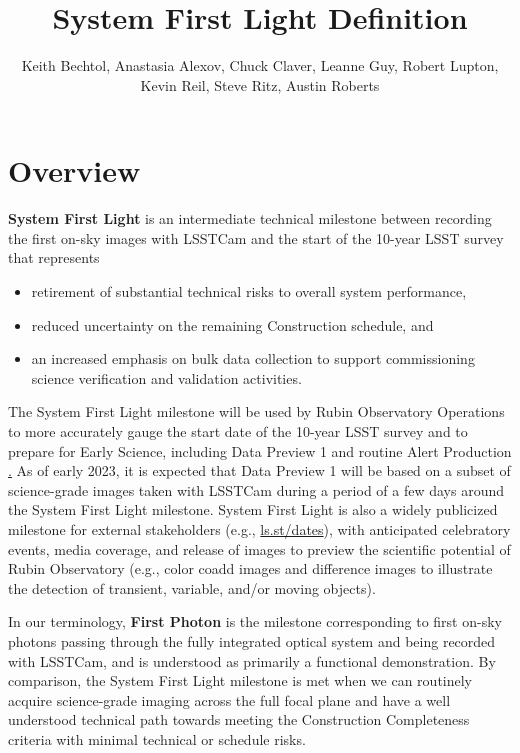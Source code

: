 \documentclass[SE,authoryear,toc,lsstdraft]{lsstdoc}
\title{System First Light Definition}
\author{%
Keith Bechtol, Anastasia Alexov, Chuck Claver, Leanne Guy, Robert Lupton, Kevin Reil, Steve Ritz, Austin Roberts
}
\date{\vcsDate}
\begin{document}
\maketitle


\section{Overview}

\textbf{System First Light} is an intermediate technical milestone between recording the first on-sky images with LSSTCam and the start of the 10-year LSST survey that represents
\begin{itemize}
  \item retirement of substantial technical risks to overall system performance,
  \item reduced uncertainty on the remaining Construction schedule, and
  \item an increased emphasis on bulk data collection to support commissioning science verification and validation activities.
\end{itemize}

The System First Light milestone will be used by Rubin Observatory Operations to more accurately gauge the start date of the 10-year LSST survey and to prepare for Early Science, including Data Preview 1 and routine Alert Production  \href{https://rtn-011.lsst.io/}.
As of early 2023, it is expected that Data Preview 1 will be based on a subset of science-grade images taken with LSSTCam during a period of a few days around the System First Light milestone.
System First Light is also a widely publicized milestone for external stakeholders (e.g., \href{https://ls.st/dates}{ls.st/dates}), with anticipated celebratory events, media coverage, and release of images to preview the scientific potential of Rubin Observatory (e.g., color coadd images and difference images to illustrate the detection of transient, variable, and/or moving objects).

In our terminology, \textbf{First Photon} is the milestone corresponding to first on-sky photons passing through the fully integrated optical system and being recorded with LSSTCam, and is understood as primarily a functional demonstration.
By comparison, the System First Light milestone is met when we can routinely acquire science-grade imaging across the full focal plane and have a well understood technical path towards meeting the Construction Completeness criteria  with minimal technical or schedule risks.
\end{document}

